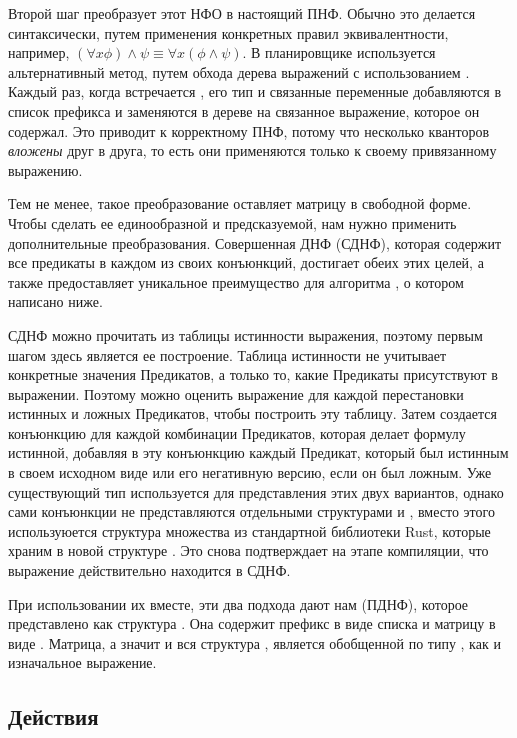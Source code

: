 Второй шаг преобразует этот НФО в настоящий ПНФ.
Обычно это делается синтаксически,
путем применения конкретных правил эквивалентности,
например, $\left(\forall x \phi\right) \land \psi \equiv \forall x \left(\phi \land \psi \right)$.
В планировщике используется альтернативный метод,
путем обхода дерева выражений с использованием .
Каждый раз, когда встречается ,
его тип и связанные переменные добавляются в список префикса
и заменяются в дереве на связанное выражение, которое он содержал.
Это приводит к корректному ПНФ, потому что несколько кванторов \textit{вложены} друг в друга,
то есть они применяются только к своему привязанному выражению.

Тем не менее, такое преобразование оставляет матрицу в свободной форме.
Чтобы сделать ее единообразной и предсказуемой, нам нужно применить дополнительные преобразования.
Совершенная ДНФ (СДНФ), которая содержит все предикаты в каждом из своих конъюнкций,
достигает обеих этих целей, а также предоставляет уникальное преимущество
для алгоритма , о котором написано ниже.

СДНФ можно прочитать из таблицы истинности выражения,
поэтому первым шагом здесь является ее построение.
Таблица истинности не учитывает конкретные значения Предикатов,
а только то, какие Предикаты присутствуют в выражении.
Поэтому можно оценить выражение для каждой перестановки
истинных и ложных Предикатов, чтобы построить эту таблицу.
Затем создается конъюнкцию для каждой комбинации Предикатов,
которая делает формулу истинной,
добавляя в эту конъюнкцию каждый Предикат, который
был истинным в своем исходном виде
или его негативную версию, если он был ложным.
Уже существующий тип 
используется для представления этих двух вариантов,
однако сами конъюнкции не представляются отдельными структурами  и ,
вместо этого используюется структура множества из стандартной библиотеки Rust,
которые храним в новой структуре .
Это снова подтверждает на этапе компиляции,
что выражение действительно находится в СДНФ.

При использовании их вместе, эти два подхода дают нам
 (ПДНФ),
которое представлено как структура .
Она содержит префикс в виде списка  и матрицу в виде .
Матрица, а значит и вся структура , является обобщенной по типу ,
как и изначальное выражение.

\subsection{Действия}

